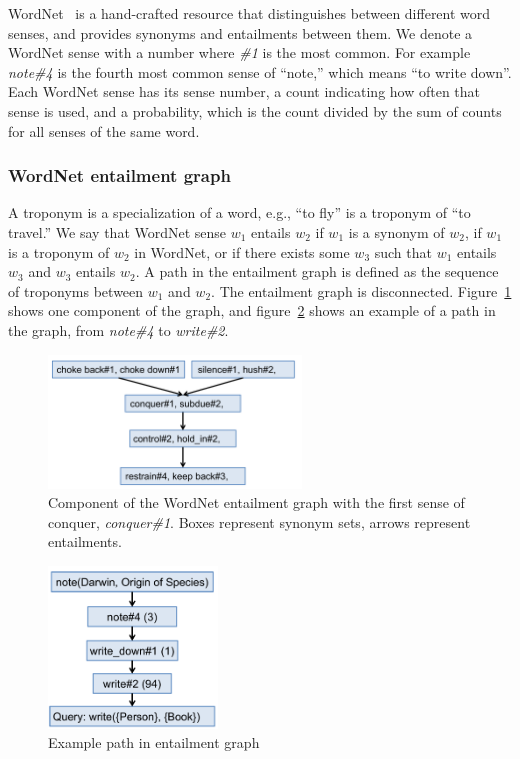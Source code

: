 \documentclass{article}
\begin{document}
WordNet~\cite{fellbaum98wordnet} is a hand-crafted resource that distinguishes between different word senses, and provides synonyms and entailments between them. We denote a WordNet sense with a number where \textit{\#1} is the most common. For example \textit{note\#4} is the fourth most common sense of ``note,'' which means ``to write down''. Each WordNet sense has its sense number, a count indicating how often that sense is used, and a probability, which is the count divided by the sum of counts for all senses of the same word.

\subsubsection{WordNet entailment graph}
A troponym is a specialization of a word, e.g., ``to fly'' is a troponym of ``to travel.'' We say that WordNet sense $w_1$ entails $w_2$ if $w_1$ is a synonym of $w_2$, if $w_1$ is a troponym of $w_2$ in WordNet, or if there exists some $w_3$ such that $w_1$ entails $w_3$ and $w_3$ entails $w_2$. A path in the entailment graph is defined as the sequence of troponyms between $w_1$ and $w_2$. The entailment graph is disconnected. Figure~\ref{wordnet-graph} shows one component of the graph, and figure~\ref{example-path} shows an example of a path in the graph, from \textit{note\#4} to \textit{write\#2}.

\begin{figure}[h]
\begin{center}
\includegraphics[width=0.6\textwidth]{figures/wordnet-graph.pdf}
\end{center}
\caption{Component of the WordNet entailment graph with the first sense of conquer, \textit{conquer\#1}. Boxes represent synonym sets, arrows represent entailments.}\label{wordnet-graph}
\end{figure}

\begin{figure}[h]
\begin{center}
\includegraphics[width=0.4\textwidth]{figures/example-path.pdf}
\end{center}
\caption{Example path in entailment graph}\label{example-path}
\end{figure}
\end{document}
